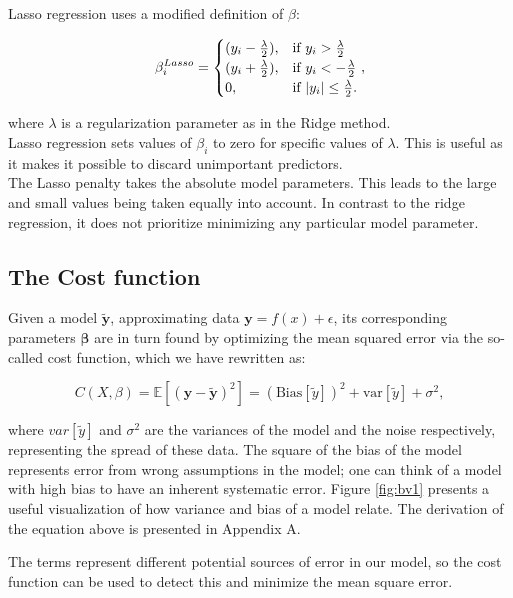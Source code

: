 \documentclass[reprint,english,notitlepage]{revtex4-1}  %
\begin{document}
Lasso regression uses a modified definition of $\beta$:

$$\beta^{Lasso}_i = \begin{cases}
    (y_i - \frac{\lambda}{2}), & \text{if  } y_i > \frac{\lambda}{2}\\
    (y_i + \frac{\lambda}{2}), & \text{if  } y_i < -\frac{\lambda}{2}\\ 
    0, & \text{if  } \abs{y_i} \leq \frac{\lambda}{2}.
\end{cases},$$

where $\lambda$ is a regularization parameter as in the Ridge method. \\


Lasso regression sets values of $\beta_i$ to zero for specific values of $\lambda$. This is useful as it makes it possible to discard unimportant predictors. \\




The Lasso penalty takes the absolute model parameters. This leads to the large and small values being taken equally into account. In contrast to the ridge regression, it does not prioritize minimizing any particular model parameter. 

\subsection{The Cost function}

Given a model $\tilde{\bm{y}}$, approximating data $\bm{y} = f(x) + \epsilon$, its corresponding parameters $\bm{\beta}$ are in turn found by optimizing the mean squared error via the so-called cost function, which we have rewritten as:

\[
C(X,\beta) = \mathbb{E}\left[(\bm{y}-\bm{\tilde{y}})^2\right]=(\mathrm{Bias}[\tilde{y}])^2+\mathrm{var}[\tilde{y}]+\sigma^2, 
\]

where $var[\tilde{y}]$ and $\sigma^2$ are the variances of the model and the noise respectively, representing the spread of these data. The square of the bias of the model represents error from wrong assumptions in the model; one can think of a model with high bias to have an inherent systematic error. Figure \ref{fig:bv1} presents a useful visualization of how variance and bias of a model relate. The derivation of the equation above is presented in Appendix A.

The terms represent different potential sources of error in our model, so the cost function can be used to detect this and minimize the mean square error.
\end{document}
